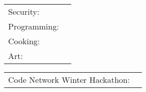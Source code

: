 \documentclass[]{awesome-cv}
\begin{document}
\begin{cventries}
	\cventry
	{}
	{\def\arraystretch{1.15}{\begin{tabular}{ l l }
		Security:  & {\skill{ Hardware, Networks, Binary}} \\
		Programming:  & {\skill{ Firmware development, python automation, game development}} \\
		Cooking:  & {\skill{ Everything}} \\
		Art:  & {\skill{ Painting, Drawing, Portraiture, Photography}} \\
		\end{tabular}}}
	{}
	{}
	{}
	\vspace{-7mm}
\end{cventries}

\begin{cventries}
	\cventry
	{}
	{\def\arraystretch{1.15}{\begin{tabular}{ l l }
		Code Network Winter Hackathon:  & {\skill{ Individual prize}} \\
		\end{tabular}}}
	{}
	{}
	{}
\end{cventries}
\vspace{-7mm}

\ 
\end{document}
